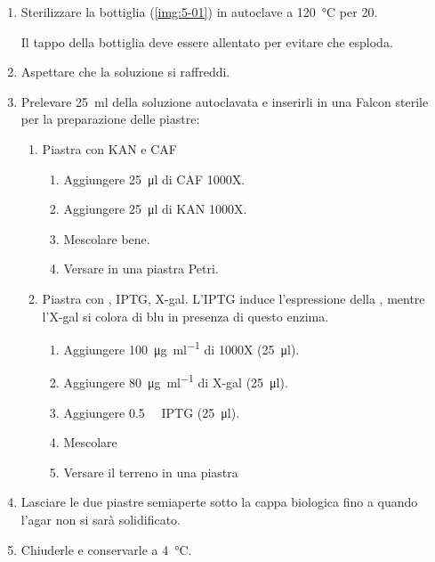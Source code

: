 \begin{enumerate}
	\item Sterilizzare la bottiglia (\autoref{img:5-01}) in autoclave a \qty{120}{\celsius}  per \qty{20}{\min}.
	      \begin{Attenzione}
		      Il tappo della bottiglia deve essere allentato per evitare che esploda.
	      \end{Attenzione}
	\item Aspettare che la soluzione si raffreddi.
	\item Prelevare \qty{25}{\ml} della soluzione autoclavata e inserirli in una Falcon sterile per la preparazione delle piastre:
	      \begin{enumerate}[label=\Alph*)]
		      \item Piastra con \gls{KAN} e \gls{CAF}
		            \begin{enumerate}[label=\arabic*.]
			            \item Aggiungere \qty{25}{\micro\litre} di \gls{CAF} 1000X.
			            \item Aggiungere \qty{25}{\micro\litre} di \gls{KAN} 1000X.
			            \item Mescolare bene.
			            \item Versare in una piastra Petri.
		            \end{enumerate}
		      \item Piastra con , \gls{IPTG}, \gls{X-gal}. L’IPTG induce l’espressione della , mentre l’\gls{X-gal} si colora di blu in presenza di questo enzima.
		            \begin{enumerate}[label=\arabic*.]
			            \item Aggiungere \qty{100}{\ug\per\ml} di  1000X (\qty{25}{\micro\litre}).
			            \item Aggiungere \qty{80}{\ug\per\ml} di \gls{X-gal} (\qty{25}{\micro\litre}).
			            \item Aggiungere \qty{0.5}{\milli\Molar} \gls{IPTG} (\qty{25}{\micro\litre}).
			            \item Mescolare
			            \item Versare il terreno in una piastra
		            \end{enumerate}
	      \end{enumerate}
	\item Lasciare le due piastre semiaperte sotto la cappa biologica fino a quando l’agar non si sarà solidificato.
	\item Chiuderle e conservarle a \qty{4}{\celsius}.
\end{enumerate}

